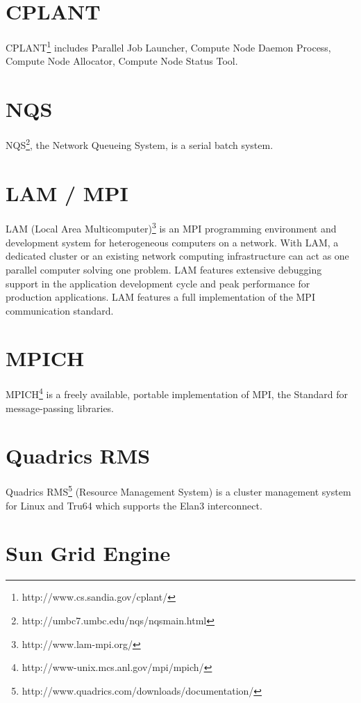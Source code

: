 \documentclass{article}
\begin{document}
\section{CPLANT}

CPLANT\footnote{http://www.cs.sandia.gov/cplant/} includes
Parallel Job Launcher, Compute Node Daemon Process,
Compute Node Allocator, Compute Node Status Tool.

\section{NQS} 

NQS\footnote{http://umbc7.umbc.edu/nqs/nqsmain.html}, 
the Network Queueing System, is a serial batch system.

\section{LAM / MPI}

LAM (Local Area Multicomputer)\footnote{http://www.lam-mpi.org/}
is an MPI programming environment and development system for heterogeneous 
computers on a network. 
With LAM, a dedicated cluster or an existing network
computing infrastructure can act as one parallel computer solving
one problem.  LAM features extensive debugging support in the
application development cycle and peak performance for production
applications. LAM features a full implementation of the MPI
communication standard.

\section{MPICH}

MPICH\footnote{http://www-unix.mcs.anl.gov/mpi/mpich/}
is a freely available, portable implementation of MPI,
the Standard for message-passing libraries.

\section{Quadrics RMS}

Quadrics
RMS\footnote{http://www.quadrics.com/downloads/documentation/}
(Resource Management System) is a cluster management system for 
Linux and Tru64 which supports the
Elan3 interconnect.  

\section{Sun Grid Engine}
\end{document}
